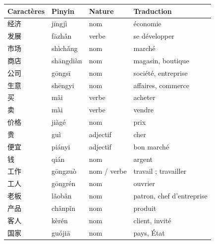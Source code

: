 \documentclass[11pt]{article}
\begin{document}
\begin{definition}
\begin{center}
\begin{tabularx}{\linewidth}{|X|X|X|X|}
\hline
\rowcolor{popblueL} Caractères & Pinyin & Nature & Traduction \\
\hline
经济 & jīngjì & nom & économie \\
\hline
发展 & fāzhǎn & verbe & se développer \\
\hline
市场 & shìchǎng & nom & marché \\
\hline
商店 & shāngdiàn & nom & magasin, boutique \\
\hline
公司 & gōngsī & nom & société, entreprise \\
\hline
生意 & shēngyi & nom & affaires, commerce \\
\hline
买 & mǎi & verbe & acheter \\
\hline
卖 & mài & verbe & vendre \\
\hline
价格 & jiàgé & nom & prix \\
\hline
贵 & guì & adjectif & cher \\
\hline
便宜 & piányi & adjectif & bon marché \\
\hline
钱 & qián & nom & argent \\
\hline
工作 & gōngzuò & nom / verbe & travail ; travailler \\
\hline
工人 & gōngrén & nom & ouvrier \\
\hline
老板 & lǎobǎn & nom & patron, chef d'entreprise \\
\hline
产品 & chǎnpǐn & nom & produit \\
\hline
客人 & kèrén & nom & client, invité \\
\hline
国家 & guójiā & nom & pays, État \\
\hline
\end{tabularx}
\end{center}
\end{definition}
\end{document}
